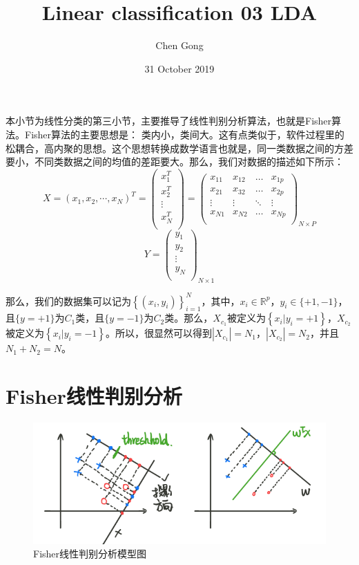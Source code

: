 \documentclass[a4paper]{article}
\title{Linear classification 03 LDA}
\author{Chen Gong}
\date{31 October 2019}
\begin{document}
\maketitle
本小节为线性分类的第三小节，主要推导了线性判别分析算法，也就是Fisher算法。Fisher算法的主要思想是：{\color{red} 类内小，类间大。}这有点类似于，软件过程里的松耦合，高内聚的思想。这个思想转换成数学语言也就是，同一类数据之间的方差要小，不同类数据之间的均值的差距要大。那么，我们对数据的描述如下所示：
\begin{equation}
    X=(x_1, x_2, \cdots, x_N)^T=
    \begin{pmatrix}
    x_1^T \\ 
    x_2^T \\
    \vdots\\
    x_N^T \\
    \end{pmatrix} =
    \begin{pmatrix}
    x_{11} & x_{12} & \dots & x_{1p}\\
    x_{21} & x_{32} & \dots & x_{2p}\\
    \vdots & \vdots & \ddots & \vdots\\
    x_{N1} & x_{N2} & \dots & x_{Np}\\
    \end{pmatrix}_{N\times P}
\end{equation}
\begin{equation}
    Y=
    \begin{pmatrix}
    y_1 \\ 
    y_2 \\
    \vdots\\
    y_N \\
    \end{pmatrix}_{N\times 1}
\end{equation}

那么，我们的数据集可以记为$\left\{ (x_i,y_i) \right\}_{i=1}^N$，其中，$x_i \in \mathbb{R}^p$，$y_i\in\{+1,-1\}$，且$\{y=+1\}$为$C_1$类，且$\{y=-1\}$为$C_2$类。那么，$X_{c_1}$被定义为$\left\{ x_i|y_i=+1 \right\}$，$X_{c_2}$被定义为$\left\{ x_i|y_i=-1 \right\}$。所以，很显然可以得到$|X_{c_1}|=N_1$，$|X_{c_2}|=N_2$，并且$N_1+N_2=N$。

\section{Fisher线性判别分析}
\begin{figure}[H]
    \centering
    \includegraphics[width=.55\textwidth]{微信图片_20191031095624.png}
    \caption{Fisher线性判别分析模型图}
    \label{fig:my_label_1}
\end{figure}
\end{document}
